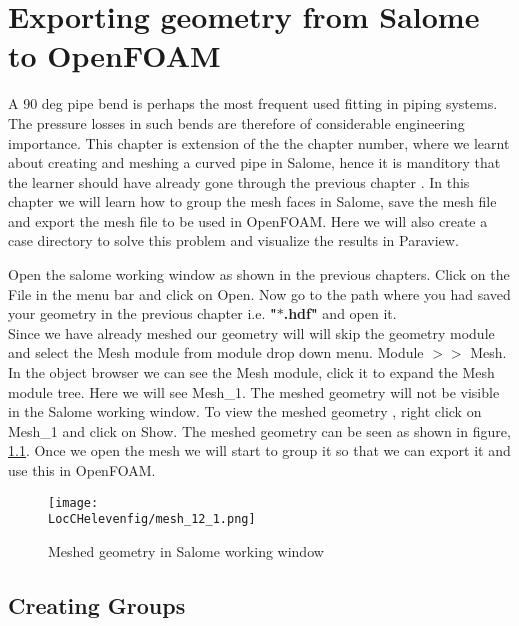 \chapter{Exporting geometry from Salome to OpenFOAM}
\thispagestyle{empty}
\label{sec:chap12}
\newcommand{\LocCHtwelvefig}{\Origin/CHAPTERS/chap12/figures}

A 90 deg pipe bend is perhaps the most frequent used fitting in piping systems. The pressure losses in such bends are therefore of considerable engineering importance. This chapter is extension of the the chapter number, where we learnt about creating and meshing a curved pipe in Salome, hence it is manditory that the learner should have already gone through the previous chapter . In this chapter we will learn how to group the mesh faces in Salome, save the mesh file and export the mesh file to be used in OpenFOAM. Here we will also create a case directory to solve this problem and visualize the results in Paraview. \newline

Open the salome working window as shown in the previous chapters. Click on the File in the menu bar and click on Open. Now go to the path where you had saved your geometry in the previous chapter i.e. \textbf{"$*$.hdf"} and open it. \\

Since we have already meshed our geometry will will skip the geometry module and select the Mesh module from module drop down menu. Module $>>$ Mesh. In the object browser we can see the Mesh module, click it to expand the Mesh module tree. Here we will see Mesh_1. The meshed geometry will not be visible in the Salome working window. To view the meshed geometry , right click on Mesh_1 and click on Show. The meshed geometry can be seen as shown in figure, \ref{mesh_1}. Once we open the mesh we will start to group it so that we can export it and use this in OpenFOAM. 

\begin{figure}[h]  
\centering
\texttt{[image: \\LocCHelevenfig/mesh\_12\_1.png]}
\caption{Meshed geometry in Salome working window}
\label{mesh_1}
\end{figure}   

\section{Creating Groups}

